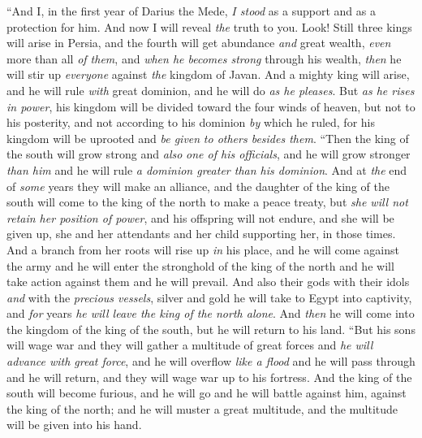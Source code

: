 \begin{biblechapter} %
 “And I, in the first year of Darius the Mede, \textit{I stood} as a support and as a protection for him.
\verse And now I will reveal \textit{the} truth to you. Look! Still three kings will arise in Persia, and the fourth will get abundance \textit{and} great wealth, \textit{even} more than all \textit{of them}, and \textit{when he becomes strong} through his wealth, \textit{then} he will stir up \textit{everyone} against \textit{the} kingdom of Javan.
\verse And a mighty king will arise, and he will rule \textit{with} great dominion, and he will do \textit{as he pleases}.
\verse But \textit{as he rises in power}, his kingdom will be divided toward the four winds of heaven, but not to his posterity, and not according to his dominion \textit{by} which he ruled, for his kingdom will be uprooted and \textit{be given} \textit{to others besides them}.
\verse “Then the king of the south will grow strong and \textit{also} \textit{one of his officials}, and he will grow stronger \textit{than him} and he will rule \textit{a dominion greater than his dominion}.
\verse And at \textit{the} end of \textit{some} years they will make an alliance, and the daughter of the king of the south will come to the king of the north to make a peace treaty, but \textit{she will not retain her position of power}, and his offspring will not endure, and she will be given up, she and her attendants and her child supporting her, in those times.
\verse And a branch from her roots will rise up \textit{in} his place, and he will come against the army and he will enter the stronghold of the king of the north and he will take action against them and he will prevail.
\verse And also their gods with their idols \textit{and} with the \textit{precious vessels}, silver and gold he will take to Egypt into captivity, and \textit{for} years \textit{he will leave the king of the north alone}.
\verse And \textit{then} he will come into the kingdom of the king of the south, but he will return to his land.
\verse “But his sons will wage war and they will gather a multitude of great forces and \textit{he will advance with great force}, and he will overflow \textit{like a flood} and he will pass through and he will return, and they will wage war up to his fortress.
\verse And the king of the south will become furious, and he will go and he will battle against him, against the king of the north; and he will muster a great multitude, and the multitude will be given into his hand.

\end{biblechapter}
